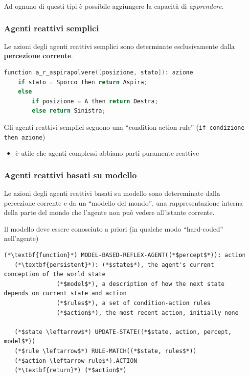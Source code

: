 \documentclass[a4paper,11pt]{report}
\begin{document}
Ad ognuno di questi tipi è possibile aggiungere la capacità di \textit{apprendere}.

\subsubsection{Agenti reattivi semplici}
Le azioni degli agenti reattivi semplici sono determinate esclusivamente dalla \textbf{percezione corrente}. 

\begin{lstlisting}[language=C]
function a_r_aspirapolvere([posizione, stato]): azione
    if stato = Sporco then return Aspira;
    else
        if posizione = A then return Destra;
        else return Sinistra;
\end{lstlisting}

Gli agenti reattivi semplici seguono una ``condition-action rule'' (\texttt{if condizione then azione})

\begin{itemize}
    \item è utile che agenti complessi abbiano parti puramente reattive
\end{itemize}

\subsubsection{Agenti reattivi basati su modello}
Le azioni degli agenti reattivi basati su modello sono detereminate dalla percezione corrente e da un ``modello del mondo'', una rappresentazione interna della parte del mondo che l'agente non può vedere all'istante corrente.

Il modello deve essere conosciuto a priori (in qualche modo ``hard-coded'' nell'agente)

\begin{lstlisting}
(*\textbf{function}*) MODEL-BASED-REFLEX-AGENT((*$percept$*)): action
   (*\textbf{persistent}*): (*$state$*), the agent's current conception of the world state
               (*$model$*), a description of how the next state depends on current state and action
               (*$rules$*), a set of condition-action rules
               (*$action$*), the most recent action, initially none

   (*$state \leftarrow$*) UPDATE-STATE((*$state, action, percept, model$*))
   (*$rule \leftarrow$*) RULE-MATCH((*$state, rules$*))
   (*$action \leftarrow rule$*).ACTION
   (*\textbf{return}*) (*$action$*)
\end{lstlisting}
\end{document}
